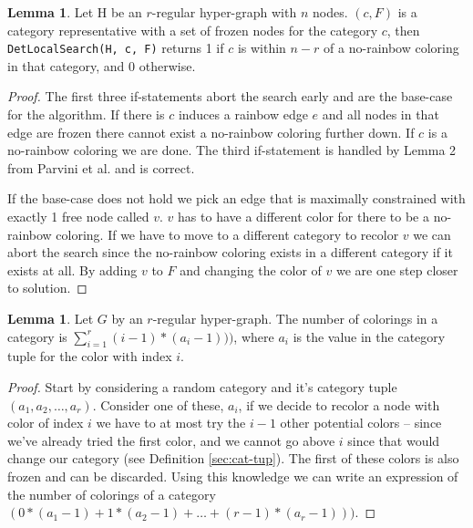 \documentclass{book}
\theoremstyle{definition}
\newtheorem{lemma}[theorem]{Lemma}
\begin{document}
\begin{lemma}
  Let H be an $r$-regular hyper-graph with $n$ nodes. $(c, F)$ is a category representative with a set of frozen nodes for the category $c$, then \texttt{DetLocalSearch(H, c, F)} returns 1 if $c$ is within $n - r$ of a no-rainbow coloring in that category, and 0 otherwise.
\end{lemma}
\begin{proof}
  The first three if-statements abort the search early and are the base-case for the algorithm. If there is $c$ induces a rainbow edge $e$ and all nodes in that edge are frozen there cannot exist a no-rainbow coloring further down. If $c$ is a no-rainbow coloring we are done. The third if-statement is handled by Lemma 2 from Parvini et al. and is correct.

  If the base-case does not hold we pick an edge that is maximally constrained with exactly 1 free node called $v$. $v$ has to have a different color for there to be a no-rainbow coloring. If we have to move to a different category to recolor $v$ we can abort the search since the no-rainbow coloring exists in a different category if it exists at all. By adding $v$ to $F$ and  changing the color of $v$ we are one step closer to solution.
\end{proof}

\begin{lemma} \label{lemma:fazter}
  Let $G$ by an $r$-regular hyper-graph. The number of colorings in a category is $\sum^r_{i=1} (i - 1) * (a_i - 1)))$, where $a_i$ is the value in the category tuple for the color with index $i$.
\end{lemma}
\begin{proof}
  Start by considering a random category and it's category tuple $(a_1, a_2, \dots, a_r)$. Consider one of these, $a_i$, if we decide to recolor a node with color of index $i$ we have to at most try the $i - 1$ other potential colors -- since we've already tried the first color, and we cannot go above $i$ since that would change our category (see Definition \ref{sec:cat-tup}). The first of these colors is also frozen and can be discarded. Using this knowledge we can write an expression of the number of colorings of a category $(0 * (a_1 - 1) + 1 * (a_2 - 1) + \dots + (r - 1) * (a_r - 1)))$.
\end{proof}
\end{document}
